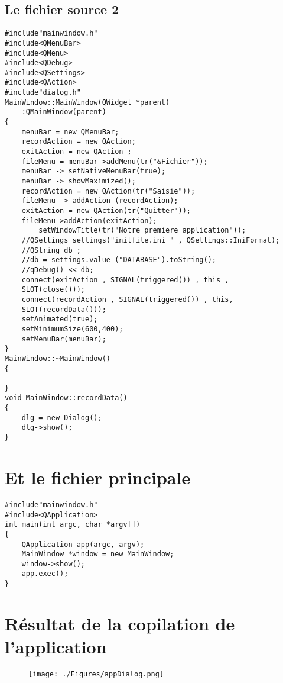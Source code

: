 \documentclass[a4paper, oneside,11pt]{book}
\begin{document}
\subsection*{Le fichier source 2}


\begin{lstlisting}
#include"mainwindow.h"
#include<QMenuBar>
#include<QMenu>
#include<QDebug>
#include<QSettings>
#include<QAction>
#include"dialog.h"
MainWindow::MainWindow(QWidget *parent)
	:QMainWindow(parent)
{
	menuBar = new QMenuBar;
	recordAction = new QAction;
	exitAction = new QAction ;
	fileMenu = menuBar->addMenu(tr("&Fichier"));
	menuBar -> setNativeMenuBar(true);
	menuBar -> showMaximized();
	recordAction = new QAction(tr("Saisie"));
	fileMenu -> addAction (recordAction);
	exitAction = new QAction(tr("Quitter"));
	fileMenu->addAction(exitAction);
        setWindowTitle(tr("Notre premiere application"));
	//QSettings settings("initfile.ini " , QSettings::IniFormat);
	//QString db ;
	//db = settings.value ("DATABASE").toString();
	//qDebug() << db;
	connect(exitAction , SIGNAL(triggered()) , this , 
	SLOT(close()));
	connect(recordAction , SIGNAL(triggered()) , this, 
	SLOT(recordData()));
	setAnimated(true);
	setMinimumSize(600,400);
	setMenuBar(menuBar);
}
MainWindow::~MainWindow()
{

}
void MainWindow::recordData()
{
	dlg = new Dialog();
	dlg->show();
}
\end{lstlisting}

\section*{Et le fichier principale}

\begin{lstlisting}
#include"mainwindow.h"
#include<QApplication>
int main(int argc, char *argv[])
{
	QApplication app(argc, argv);
	MainWindow *window = new MainWindow;	
	window->show();
	app.exec();
}
\end{lstlisting}
\section*{R\'esultat de la copilation de l'application}
\begin{figure}[hhhh]
\begin{center}
\texttt{[image: ./Figures/appDialog.png]}
\end{center}
\end{figure}
\end{document}
